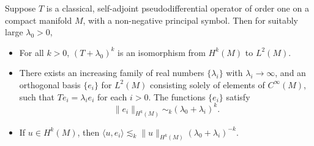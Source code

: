 \begin{theorem}
    Suppose $T$ is a classical, self-adjoint pseudodifferential operator of order one on a compact manifold $M$, with a non-negative principal symbol. Then for suitably large $\lambda_0 > 0$,
    \begin{itemize}
        \item For all $k > 0$, $(T + \lambda_0)^k$ is an isomorphism from $H^k(M)$ to $L^2(M)$.

        \item There exists an increasing family of real numbers $\{ \lambda_i \}$ with $\lambda_i \to \infty$, and an orthogonal basis $\{ e_i \}$ for $L^2(M)$ consisting solely of elements of $C^\infty(M)$, such that $Te_i = \lambda_i e_i$ for each $i > 0$. The functions $\{ e_i \}$ satisfy
        \[ \| e_i \|_{H^k(M)} \sim_k (\lambda_0 + \lambda_i)^k. \]

        \item If $u \in H^k(M)$, then $\langle u, e_i \rangle \lesssim_k \| u \|_{H^k(M)} (\lambda_0 + \lambda_i)^{-k}$.
    \end{itemize}
\end{theorem}
